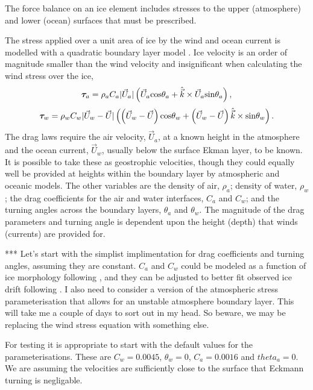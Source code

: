 The force balance on an ice element includes stresses to the upper (atmosphere) and lower (ocean) surfaces that must be prescribed. 

The stress applied over a unit area of ice by the wind and ocean current is modelled with a quadratic boundary layer model \cite{Brown79,McPhee_Smith,McPheeJPO}. Ice velocity is an order of magnitude smaller than the wind velocity and insignificant when calculating the wind stress over the ice,
%
\begin{equation}
    {\boldsymbol{\tau}}_a = \rho_a C_a |\Vec{U}_a| 
          \left ( \Vec{U}_a \mathrm{cos} \theta_a + 
          \hat{\Vec{k}} \times \Vec{U}_a \mathrm{sin} \theta_a \right ) ,
\end{equation}
%
\begin{equation}
    {\boldsymbol{\tau}}_w = \rho_w C_w |\Vec{U}_w - \Vec{U}| 
         \left ( \left (\Vec{U}_w - \Vec{U} \right ) \mathrm{cos} \theta_w +
         \left (\Vec{U}_w - \Vec{U} \right ) \hat{\Vec{k}} \times \mathrm{sin} \theta_w
         \right ) .
\end{equation}
%
The drag laws require the air velocity, $\Vec{U}_a$, at a known height in the atmosphere and the ocean current, $\Vec{U}_w$, usually below the surface Ekman layer, to be known. It is possible to take these as geostrophic velocities, though they could equally well be provided at heights within the boundary layer by atmospheric and oceanic models. The other variables are the density of air, $\rho_a$; density of water, $\rho_w$; the drag coefficients for the air and water interfaces, $C_a$ and $C_w$; and the turning angles across the boundary layers, $\theta_a$ and $\theta_w$. The magnitude of the drag parameters and turning angle is dependent upon the height (depth) that winds (currents) are provided for.

{\color{red} *** Let's start with the simplist implimentation for drag coefficients and turning angles, assuming they are constant. $C_a$ and $C_w$ could be modeled as a function of ice morphology following \cite{Tsamadosetal2014}, and they can be adjusted to better fit observed ice drift following \cite{Kreysher??}. I also need to consider a version of the atmospheric stress parameterisation that allows for an unstable atmosphere boundary layer. This will take me a couple of days to sort out in my head. So beware, we may be replacing the wind stress equation with something else.}

For testing it is appropriate to start with the default values for the parameterisations. These are $C_w = 0.0045$, $\theta_w = 0$, $C_a=0.0016$ and $theta_a= 0$. We are assuming the velocities are sufficiently close to the surface that Eckmann turning is negligable.

